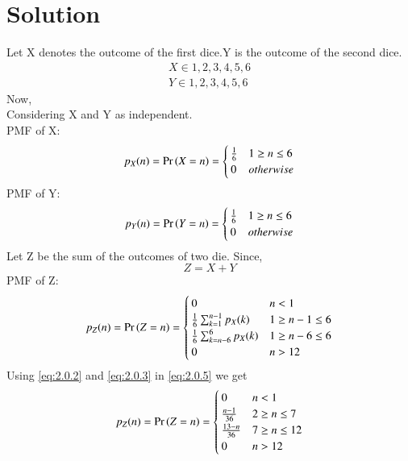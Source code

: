 \documentclass[journal,12pt,twocolumn]{IEEEtran}
\begin{document}
\section{Solution}
Let X denotes the outcome of the first dice.Y is the outcome of the second dice.\\
\begin{equation}\label{eq:2.0.1}
\begin{split}
    X \in {1,2,3,4,5,6}\\
    Y \in {1,2,3,4,5,6}
\end{split}
\end{equation}
Now, \\
    Considering X and Y as independent.\\
    PMF of X:
    \begin{equation}\label{eq:2.0.2}
        p_X(n) = \Pr\left(X=n\right) = \begin{cases}
    \frac{1}{6} & 1\geq n\leq 6 \\
    0 & otherwise \\
   \end{cases}
   \end{equation}
   PMF of Y:
    \begin{equation}\label{eq:2.0.3}
        p_Y(n) = \Pr\left(Y=n\right) = \begin{cases}
    \frac{1}{6} & 1\geq n\leq 6 \\
    0 & otherwise \\
  \end{cases}
    \end{equation}
 Let Z be the sum of the outcomes of two die.
   Since,
   \begin{equation}\label{eq:2.0.4}
    Z = X + Y
   \end{equation}
  PMF of Z:
  \begin{equation}\label{eq:2.0.5}
        p_Z(n) = \Pr\left(Z=n\right) = \begin{cases}
        0  & n < 1\\
    \frac{1}{6} \sum_{k=1}^{n-1} p_X(k)  & 1\geq n-1 \leq 6 \\
    \frac{1}{6} \sum_{k=n-6}^{6} p_X(k) & 1\geq n-6 \leq 6 \\
    0 & n > 12
  \end{cases}
    \end{equation}
    Using \eqref{eq:2.0.2} and \eqref{eq:2.0.3} in \eqref{eq:2.0.5} we get
    \begin{equation}\label{eq:2.0.6}
     p_Z(n) = \Pr\left(Z=n\right) = \begin{cases}
        0  & n < 1\\
    \frac{n-1}{36}   & 2\geq n \leq 7 \\
    \frac{13-n}{36}  & 7\geq n \leq 12 \\
    0 & n > 12
    \end{cases}
    \end{equation}
\end{document}
